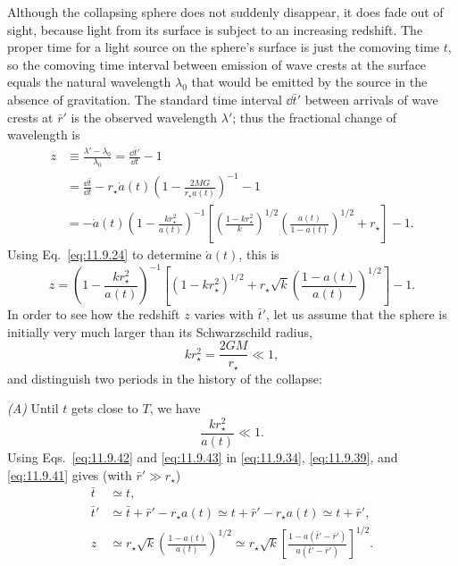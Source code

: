 Although the collapsing sphere does not suddenly disappear, it does fade out
of sight, because light from its surface is subject to an increasing redshift.
The proper time for a light source on the sphere's surface is just the
comoving time \(t\), so the comoving time interval between emission of wave
crests at the surface equals the natural wavelength \(\lambda_0\) that would
be emitted by the source in the absence of gravitation. The standard time
interval \(\dd\bar t'\) between arrivals of wave crests at \(\bar r'\) is the
observed wavelength \(\lambda'\); thus the fractional change of wavelength is
\[
  \begin{aligned}
  z
  &\equiv\frac{\lambda'-\lambda_0}{\lambda_0}
   =\frac{\dd\bar t'}{\dd t}-1\\
  &=\frac{\dd\bar t}{\dd t}
    -r_\star\dot a(t)
     \left(1-\frac{2MG}{r_\star a(t)}\right)^{-1}
    -1\\
  &=-\dot a(t)
    \left(1-\frac{kr_\star^2}{a(t)}\right)^{-1}
    \left[
      \left(\frac{1-kr_\star^2}{k}\right)^{1/2}
      \left(\frac{a(t)}{1-a(t)}\right)^{1/2}
      +r_\star
    \right]-1.
  \end{aligned}
\]
Using Eq.~\eqref{eq:11.9.24} to determine \(\dot a(t)\), this is
\begin{equation}
  z
  =
  \left(1-\frac{kr_\star^2}{a(t)}\right)^{-1}
  \left[
    (1-kr_\star^2)^{1/2}
    +r_\star\sqrt k
     \left(\frac{1-a(t)}{a(t)}\right)^{1/2}
  \right]-1.
  \tag{11.9.41}\label{eq:11.9.41}
\end{equation}
In order to see how the redshift \(z\) varies with \(\bar t'\), let us assume
that the sphere is initially very much larger than its Schwarzschild radius,
\begin{equation}
  kr_\star^2=\frac{2GM}{r_\star}\ll1,
  \tag{11.9.42}\label{eq:11.9.42}
\end{equation}
and distinguish two periods in the history of the collapse:

\emph{(A)} Until \(t\) gets close to \(T\), we have
\begin{equation}
  \frac{kr_\star^2}{a(t)}\ll1.
  \tag{11.9.43}\label{eq:11.9.43}
\end{equation}
Using Eqs.~\eqref{eq:11.9.42} and \eqref{eq:11.9.43} in
\eqref{eq:11.9.34}, \eqref{eq:11.9.39}, and \eqref{eq:11.9.41} gives
(with \(\bar r'\gg r_\star\))
\begin{equation}
  \begin{aligned}
  \bar t&\simeq t,\\
  \bar t'
  &\simeq\bar t+\bar r'-r_\star a(t)
   \simeq t+\bar r'-r_\star a(t)
   \simeq t+\bar r',\\
  z
  &\simeq
  r_\star\sqrt k
  \left(\frac{1-a(t)}{a(t)}\right)^{1/2}
  \simeq
  r_\star\sqrt k
  \left[
    \frac{1-a(\bar t'-\bar r')}{a(\bar t'-\bar r')}
  \right]^{1/2}.
  \end{aligned}
  \tag{11.9.44}\label{eq:11.9.44}
\end{equation}

